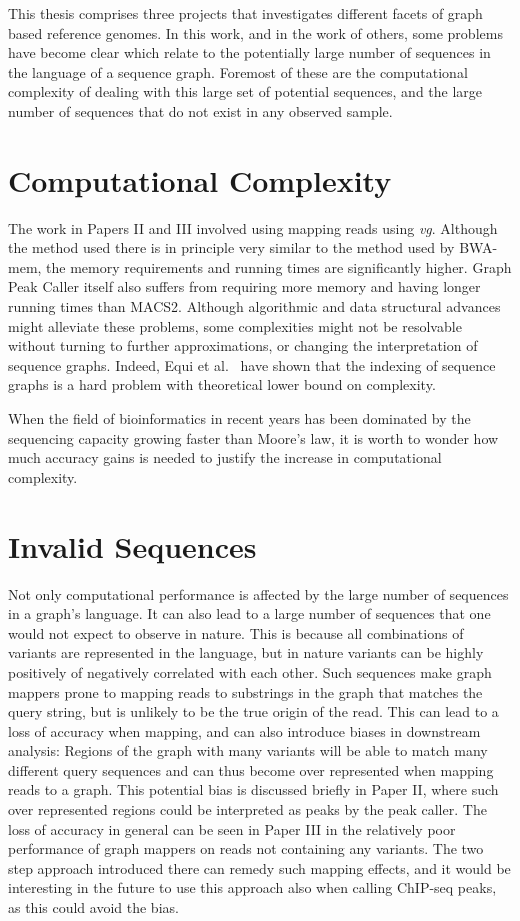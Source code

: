This thesis comprises three projects that investigates different facets of graph based reference genomes.
In this work, and in the work of others, some problems have become clear which relate to the potentially large number of sequences in the language of a sequence graph. Foremost of these are the computational complexity of dealing with this large set of potential sequences, and the large number of sequences that do not exist in any observed sample.

\section{Computational Complexity}
The work in Papers II and III involved using mapping reads using \emph{vg}.
Although the method used there is in principle very similar to the method used by BWA-mem, the memory requirements and running times are significantly higher.
Graph Peak Caller itself also suffers from requiring more memory and having longer running times than MACS2. 
Although algorithmic and data structural advances might alleviate these problems, some complexities might not be resolvable without turning to further approximations, or changing the interpretation of sequence graphs.
Indeed, Equi et al.~\cite{indexcomplexity} have shown that the indexing of sequence graphs is a hard problem with theoretical lower bound on complexity.

When the field of bioinformatics in recent years has been dominated by the sequencing capacity growing faster than Moore's law, it is worth to wonder how much accuracy gains is needed to justify the increase in computational complexity.

\section{Invalid Sequences}
Not only computational performance is affected by the large number of sequences in a graph's language.
It can also lead to a large number of sequences that one would not expect to observe in nature.
This is because all combinations of variants are represented in the language, but in nature variants can be highly positively of negatively correlated with each other.
Such sequences make graph mappers prone to mapping reads to substrings in the graph that matches the query string, but is unlikely to be the true origin of the read.
This can lead to a loss of accuracy when mapping, and can also introduce biases in downstream analysis: Regions of the graph with many variants will be able to match many different query sequences and can thus become over represented when mapping reads to a graph.
This potential bias is discussed briefly in Paper II, where such over represented regions could be interpreted as peaks by the peak caller.
The loss of accuracy in general can be seen in Paper III in the relatively poor performance of graph mappers on reads not containing any variants.
The two step approach introduced there can remedy such mapping effects, and it would be interesting in the future to use this approach also when calling ChIP-seq peaks, as this could avoid the bias.

